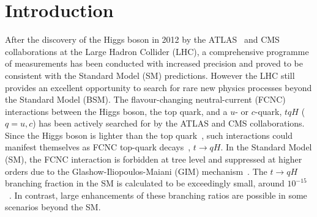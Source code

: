 \section{Introduction}
\label{sec:intro}
After the discovery of the Higgs boson in 2012 by the ATLAS~\cite{Aad:2012tfa} and CMS~\cite{Chatrchyan:2012ufa} collaborations at 
the Large Hadron Collider (LHC), a comprehensive programme of measurements %
has been conducted with increased precision and proved to be consistent with the Standard Model (SM) predictions. 
However the LHC still provides an excellent opportunity to search for rare new physics processes beyond the Standard Model (BSM).  
The flavour-changing neutral-current (FCNC) interactions 
between the Higgs boson, the top quark, and a $u$- or $c$-quark, $tqH$ ($q=u,c$) has been actively searched for by the ATLAS and CMS collaborations.
Since the Higgs boson is lighter than the top quark~\cite{Aad:2015zhl},
such interactions could manifest themselves as FCNC top-quark decays~\cite{Agashe:2013hma}, $t\to qH$.  
In the Standard Model (SM), the FCNC interaction is forbidden at tree level and suppressed at higher orders due to the Glashow-Iliopoulos-Maiani (GIM) mechanism~\cite{Glashow:1970gm}. The $t\to qH$ branching fraction in the SM is calculated to be exceedingly small, around $10^{-15}$~\cite{Eilam:1990zc,Mele:1998ag,AguilarSaavedra:2004wm,Zhang:2013xya}. 
In contrast, large enhancements of these branching ratios are possible in some scenarios beyond the SM.

